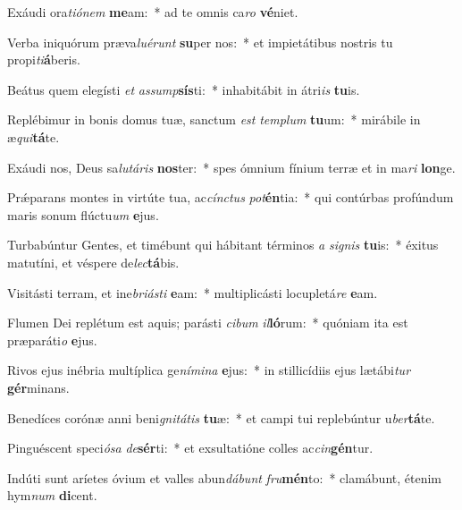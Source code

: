 \item Exáudi ora\textit{ti}\textit{ó}\textit{nem} \textbf{me}am:~* ad te omnis ca\textit{ro} \textbf{vé}niet.
\item Verba iniquórum præva\textit{lu}\textit{é}\textit{runt} \textbf{su}per nos:~* et impietátibus nostris tu propi\textit{ti}\textbf{á}beris.
\item Beátus quem elegísti \textit{et} \textit{as}\textit{sump}\textbf{sís}ti:~* inhabitábit in átri\textit{is} \textbf{tu}is.
\item Replébimur in bonis domus tuæ, sanctum \textit{est} \textit{tem}\textit{plum} \textbf{tu}um:~* mirábile in æ\textit{qui}\textbf{tá}te.
\item Exáudi nos, Deus sa\textit{lu}\textit{tá}\textit{ris} \textbf{nos}ter:~* spes ómnium fínium terræ et in ma\textit{ri} \textbf{lon}ge.
\item Prǽparans montes in virtúte tua, ac\textit{cínc}\textit{tus} \textit{pot}\textbf{én}tia:~* qui contúrbas profúndum maris sonum flúctu\textit{um} \textbf{e}jus.
\item Turbabúntur Gentes, et timébunt qui hábitant términos \textit{a} \textit{si}\textit{gnis} \textbf{tu}is:~* éxitus matutíni, et véspere de\textit{lec}\textbf{tá}bis.
\item Visitásti terram, et ine\textit{bri}\textit{ás}\textit{ti} \textbf{e}am:~* multiplicásti locupletá\textit{re} \textbf{e}am.
\item Flumen Dei replétum est aquis; parásti \textit{ci}\textit{bum} \textit{il}\textbf{ló}rum:~* quóniam ita est præparáti\textit{o} \textbf{e}jus.
\item Rivos ejus inébria multíplica ge\textit{ní}\textit{mi}\textit{na} \textbf{e}jus:~* in stillicídiis ejus lætábi\textit{tur} \textbf{gér}minans.
\item Benedíces corónæ anni beni\textit{gni}\textit{tá}\textit{tis} \textbf{tu}æ:~* et campi tui replebúntur u\textit{ber}\textbf{tá}te.
\item Pinguéscent speci\textit{ó}\textit{sa} \textit{de}\textbf{sér}ti:~* et exsultatióne colles ac\textit{cin}\textbf{gén}tur.
\item Indúti sunt aríetes óvium et valles abun\textit{dá}\textit{bunt} \textit{fru}\textbf{mén}to:~* clamábunt, étenim hym\textit{num} \textbf{di}cent.
